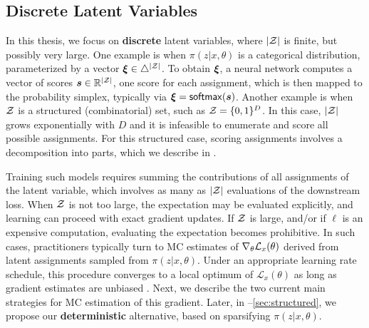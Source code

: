 \subsection{Discrete Latent Variables}\label{sec:discrete_lvm_bg}

In this thesis, we focus on \textbf{discrete} latent variables, where
$|\mathcal{Z}|$ is finite, but possibly very large. One example is when
$\pi(z|x,\theta)$ is a categorical distribution, parameterized by a
vector $\bm{\xi} \in \triangle^{|\mathcal{Z}|}$. To obtain $\bm{\xi}$, a neural network
computes a vector of scores $\bm{s} \in \mathbb{R}^{|\mathcal{Z}|}$, one score
for each assignment, which is then mapped to the probability simplex,
typically via $\bm{\xi} = \operatorname*{\mathsf{softmax}}(\bm{s})$. Another example is when $\mathcal{Z}$ is
a structured (combinatorial) set, such as $\mathcal{Z} = \{0, 1\}^D$. In this
case, $|\mathcal{Z}|$ grows exponentially with $D$ and it is infeasible to
enumerate and score all possible assignments. For this structured
case, scoring assignments involves a decomposition into parts, which
we describe in .

Training such models requires summing the contributions of all
assignments of the latent variable, which involves as many as $|\mathcal{Z}|$
evaluations of the downstream loss. When $\mathcal{Z}$ is not too large, the
expectation may be evaluated explicitly, and learning can proceed
with exact gradient updates. If $\mathcal{Z}$ is large, and/or if $\ell$ is
an expensive computation, evaluating the expectation becomes
prohibitive. In such cases, practitioners typically turn to MC
estimates of $\nabla_\theta \mathcal{L}_x(\theta)$ derived from latent
assignments sampled from $\pi(z|x,\theta)$. Under an appropriate
learning rate schedule, this procedure converges to a local optimum
of $\mathcal L_x(\theta)$ as long as gradient estimates are unbiased
\citep{robbins1951stochastic}. Next, we describe the two current main
strategies for MC estimation of this gradient. Later, in
--\ref{sec:structured}, we propose our
\textbf{deterministic} alternative, based on sparsifying $\pi(z| x,
\theta)$.

